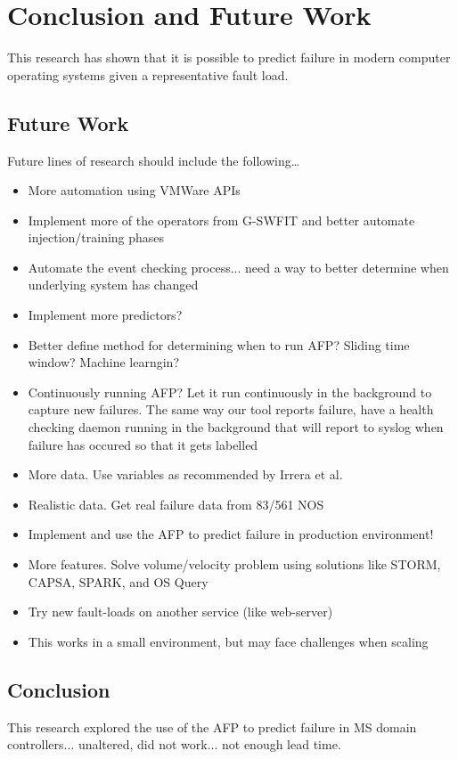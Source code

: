 \chapter{Conclusion and Future Work} \label{chapter5}
This research has shown that it is possible to predict failure in modern
computer operating systems given a representative fault load.

\section{Future Work}
Future lines of research should include the following\dots

\begin{itemize}
\item{More automation using VMWare APIs}
\item{Implement more of the operators from G-SWFIT and better automate
injection/training phases}
\item{Automate the event checking process... need a way to better determine
when underlying system has changed}
\item{Implement more predictors?}
\item{Better define method for determining when to run AFP? Sliding time
window?  Machine learngin?}
\item{Continuously running AFP?  Let it run continuously in the background to
capture new failures.  The same way our tool reports failure, have a health
checking daemon running in the background that will report to syslog when
failure has occured so that it gets labelled}
\item{More data.  Use variables as recommended by Irrera et al.}
\item{Realistic data.  Get real failure data from 83/561 NOS}
\item{Implement and use the AFP to predict failure in production environment!}
\item{More features.  Solve volume/velocity problem using solutions like STORM,
CAPSA, SPARK, and OS Query}
\item{Try new fault-loads on another service (like web-server)}
\item{This works in a small environment, but may face challenges when scaling}
\end{itemize}

\section{Conclusion}
This research explored the use of the AFP to predict failure in MS domain
controllers... unaltered, did not work... not enough lead time.

